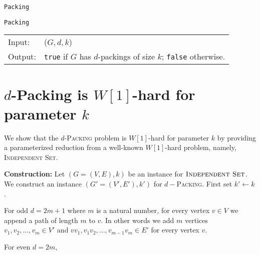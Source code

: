 \documentclass[10pt, a4paper]{article}
\theoremstyle{definition}
\newcommand{\n}{\\}
\begin{document}
\begin{algorithm}[H]
\caption{\texttt{Packing}}          %
\label{algo:packing} 
\texttt{Packing}\n
\begin{tabular}{l l}
 Input:  & ($G, d, k$) \n
 Output: & \texttt{true} if $G$ has $d$-packings of size $k$; \texttt{false} otherwise. \n
\end{tabular}	

\end{algorithm}

\clearpage
\section{$d$-\sc Packing \textnormal{is $W[1]$-hard for parameter $k$}}


We show that the $d$-\textsc{Packing} problem is $W[1]$-hard for parameter $k$ by providing a parameterized reduction from a well-known $W[1]$-hard problem, namely, \textsc{Independent Set}.	

\textbf{Construction:} Let $(G = (V,E) ,k)$ be an instance for $\textsc{Independent Set}$. We construct an instance $(G' = (V',E'),k')$ for $d-$\textsc{Packing}. First set $k' \leftarrow k$. 

For odd $d = 2m+1$ where $m$ is a natural number, for every vertex $v \in V$ we append a path of length $m$ to $v$. In other words we add $m$ vertices $v_1, v_2, ..., v_m \in V'$ and $vv_1, v_1v_2,...,v_{m-1}v_m \in E'$ for every vertex $v$.


For even $d = 2m$,

\end{document}
